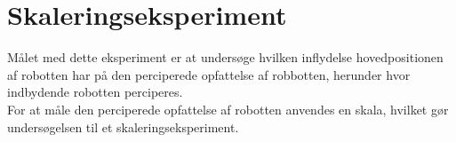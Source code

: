 \chapter*{Skaleringseksperiment}
%
Målet med dette eksperiment er at undersøge hvilken inflydelse hovedpositionen af robotten har på den perciperede opfattelse af robbotten, herunder hvor indbydende robotten perciperes. 
\\
For at måle den perciperede opfattelse af robotten anvendes en skala, hvilket gør undersøgelsen til et skaleringseksperiment. 
 


